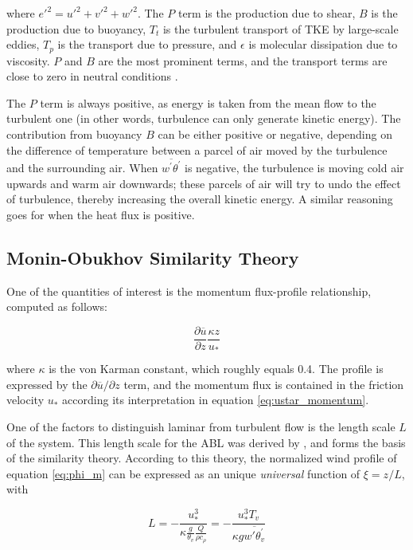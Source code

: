 \documentclass[a4paper,11pt]{kth-mag}
\begin{document}
\noindent where ${e'}^2={u'}^2+{v'}^2+{w'}^2$. The $P$ term is the production due to shear, $B$ is the production due to buoyancy, $T_t$ is the turbulent transport of TKE by large-scale eddies, $T_p$ is the transport due to pressure, and $\epsilon$ is molecular dissipation due to viscosity. $P$ and $B$ are the most prominent terms, and the transport terms are close to zero in neutral conditions \citep{basicatm}.

The $P$ term is always positive, as energy is taken from the mean flow to the turbulent one (in other words, turbulence can only generate kinetic energy). The contribution from buoyancy $B$ can be either positive or negative, depending on the difference of temperature between a parcel of air moved by the turbulence and the surrounding air. When $\overline{w^\prime\theta^\prime}$ is negative, the turbulence is moving cold air upwards and warm air downwards; these parcels of air will try to undo the effect of turbulence, thereby increasing the overall kinetic energy. A similar reasoning goes for when the heat flux is positive.

\subsection{Monin-Obukhov Similarity Theory}
\label{sec:most}
One of the quantities of interest is the momentum flux-profile relationship, computed as follows:

\begin{equation}
\label{eq:phi_m}
\frac{\partial\overline{u}}{\partial z}\frac{\kappa z}{u_*}
\end{equation}

\noindent where $\kappa$ is the von Karman constant, which roughly equals 0.4. The profile is expressed by the $\partial\overline{u}/\partial z$ term, and the momentum flux is contained in the friction velocity $u_*$ according its interpretation in equation \ref{eq:ustar_momentum}.

One of the factors to distinguish laminar from turbulent flow is the length scale $L$ of the system. This length scale for the ABL was derived by \cite{mostayyyy}, and forms the basis of the similarity theory. According to this theory, the normalized wind profile of equation \ref{eq:phi_m} can be expressed as an unique \emph{universal} function of $\xi=z/L$, with

\begin{equation}
\label{eq:most_l}
L=-\frac{u_*^3}{\kappa\frac{g}{\theta_v}\frac{Q}{\rho c_\rho}}
=-\frac{u_*^3 T_v}{\kappa g \overline{w'\theta^\prime_v}}
\end{equation}
\end{document}
